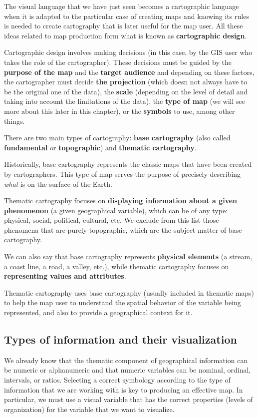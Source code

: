 The visual language that we have just seen becomes a cartographic language when it is adapted to the particular case of creating maps and knowing its rules is needed to create cartography that is later useful for the map user. All these ideas related to map production form what is known as \textbf{cartographic design}.

Cartographic design involves making decisions (in this case, by the GIS user who takes the role of the cartographer). These decisions must be guided by the \textbf{purpose of the map} and the \textbf{target audience} and depending on these factors, the cartographer must decide \textbf{the projection} (which doesn not always have to be the original one of the data), the \textbf{scale} (depending on the level of detail and taking into account the limitations of the data), the \textbf{type of map} (we will see more about this later in this chapter), or the \textbf{symbols} to use, among other things.

There are two main types of cartography: \textbf{base cartography} (also called \textbf{fundamental} or \textbf{topographic}) and \textbf{thematic cartography}.

Historically, base cartography represents the classic maps that have been created by cartographers. This type of map serves the purpose of precisely describing \emph{what} is on the surface of the Earth.

Thematic cartography focuses on \textbf{displaying information about a given phenomenon} (a given geographical variable), which can be of any type: physical, social, political, cultural, etc. We exclude from this list those phenomena that are purely topographic, which are the subject matter of base cartography.

We can also say that base cartography represents \textbf{physical elements} (a stream, a coast line, a road, a valley, etc.), while thematic cartography focuses on \textbf{representing values and attributes}.

Thematic cartography uses base cartography (usually included in thematic maps) to help the map user to understand the spatial behavior of the variable being represented, and also to provide a geographical context for it.


\subsection{Types of information and their visualization}

We already know that the thematic component of geographical information can be numeric or alphanumeric and that numeric variables can be nominal, ordinal, intervals, or ratios. Selecting a correct symbology according to the type of information that we are working with is key to producing an effective map. In particular, we must use a visual variable that has the correct properties (levels of organization) for the variable that we want to visualize.


